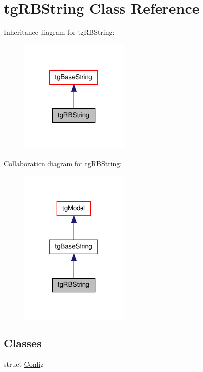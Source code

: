 \hypertarget{classtg_r_b_string}{\section{tg\-R\-B\-String Class Reference}
\label{classtg_r_b_string}
}


Inheritance diagram for tg\-R\-B\-String\-:\nopagebreak
\begin{figure}[H]
\begin{center}
\leavevmode
\includegraphics[width=152pt]{classtg_r_b_string__inherit__graph}
\end{center}
\end{figure}


Collaboration diagram for tg\-R\-B\-String\-:\nopagebreak
\begin{figure}[H]
\begin{center}
\leavevmode
\includegraphics[width=152pt]{classtg_r_b_string__coll__graph}
\end{center}
\end{figure}
\subsection*{Classes}
\begin{DoxyCompactItemize}
\item 
struct \hyperlink{structtg_r_b_string_1_1_config}{Config}
\end{DoxyCompactItemize}

